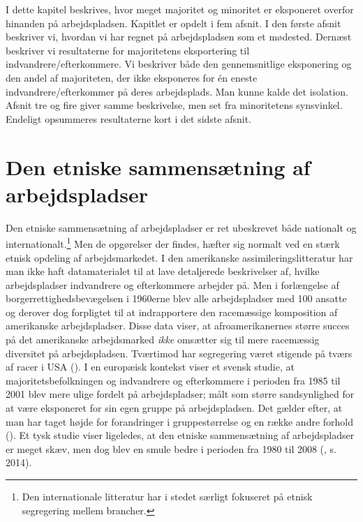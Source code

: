 \documentclass[
]{book}
\begin{document}
I dette kapitel beskrives, hvor meget majoritet og minoritet er eksponeret overfor hinanden på arbejdspladsen. Kapitlet er opdelt i fem afsnit. I den første afsnit beskriver vi, hvordan vi har regnet på arbejdspladsen som et mødested. Dernæst beskriver vi resultaterne for majoritetens eksportering til indvandrere/efterkommere. Vi beskriver både den gennemsnitlige eksponering og den andel af majoriteten, der ikke eksponeres for én eneste indvandrere/efterkommer på deres arbejdsplads. Man kunne kalde det isolation. Afsnit tre og fire giver samme beskrivelse, men set fra minoritetens synsvinkel. Endeligt opsummeres resultaterne kort i det sidste afsnit.

\section{Den etniske sammensætning af arbejdspladser}\label{den-etniske-sammensuxe6tning-af-arbejdspladser}

Den etniske sammensætning af arbejdspladser er ret ubeskrevet både nationalt og internationalt.\footnote{Den internationale litteratur har i stedet særligt fokuseret på etnisk segregering mellem brancher.} Men de opgørelser der findes, hæfter sig normalt ved en stærk etnisk opdeling af arbejdsmarkedet. I den amerikanske assimileringslitteratur har man ikke haft datamaterialet til at lave detaljerede beskrivelser af, hvilke arbejdspladser indvandrere og efterkommere arbejder på. Men i forlængelse af borgerrettighedsbevægelsen i 1960erne blev alle arbejdspladser med 100 ansatte og derover dog forpligtet til at indrapportere den racemæssige komposition af amerikanske arbejdspladser. Disse data viser, at afroamerikanernes større succes på det amerikanske arbejdsmarked \emph{ikke} omsætter sig til mere racemæssig diversitet på arbejdspladsen. Tværtimod har segregering været stigende på tværs af racer i USA (). I en europæisk kontekst viser et svensk studie, at majoritetsbefolkningen og indvandrere og efterkommere i perioden fra 1985 til 2001 blev mere ulige fordelt på arbejdspladser; målt som større sandsynlighed for at være eksponeret for sin egen gruppe på arbejdspladsen. Det gælder efter, at man har taget højde for forandringer i gruppestørrelse og en række andre forhold (). Et tysk studie viser ligeledes, at den etniske sammensætning af arbejdspladser er meget skæv, men dog blev en smule bedre i perioden fra 1980 til 2008 (, s. 2014).
\end{document}

